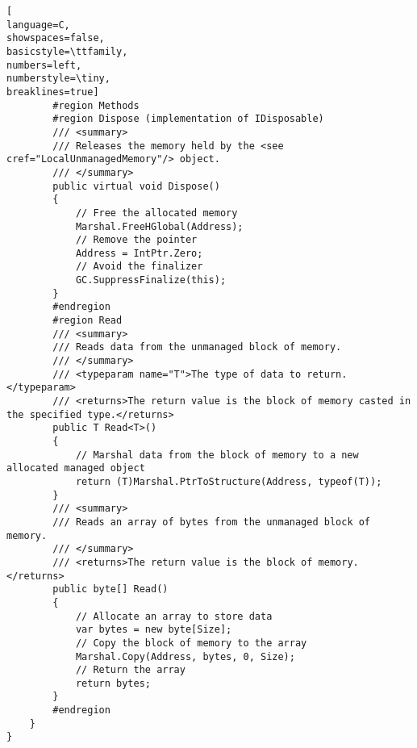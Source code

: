 \documentclass[a4paper]{article}
\begin{document}
\begin{lstlisting}[
language=C,
showspaces=false,
basicstyle=\ttfamily,
numbers=left,
numberstyle=\tiny,
breaklines=true]
        #region Methods
        #region Dispose (implementation of IDisposable)
        /// <summary>
        /// Releases the memory held by the <see cref="LocalUnmanagedMemory"/> object.
        /// </summary>
        public virtual void Dispose()
        {
            // Free the allocated memory
            Marshal.FreeHGlobal(Address);
            // Remove the pointer
            Address = IntPtr.Zero;
            // Avoid the finalizer
            GC.SuppressFinalize(this);
        }
        #endregion
        #region Read
        /// <summary>
        /// Reads data from the unmanaged block of memory.
        /// </summary>
        /// <typeparam name="T">The type of data to return.</typeparam>
        /// <returns>The return value is the block of memory casted in the specified type.</returns>
        public T Read<T>()
        {
            // Marshal data from the block of memory to a new allocated managed object
            return (T)Marshal.PtrToStructure(Address, typeof(T));
        }
        /// <summary>
        /// Reads an array of bytes from the unmanaged block of memory.
        /// </summary>
        /// <returns>The return value is the block of memory.</returns>
        public byte[] Read()
        {
            // Allocate an array to store data
            var bytes = new byte[Size];
            // Copy the block of memory to the array
            Marshal.Copy(Address, bytes, 0, Size);
            // Return the array
            return bytes;
        }
        #endregion
    }
}
\end{lstlisting}
\end{document}
